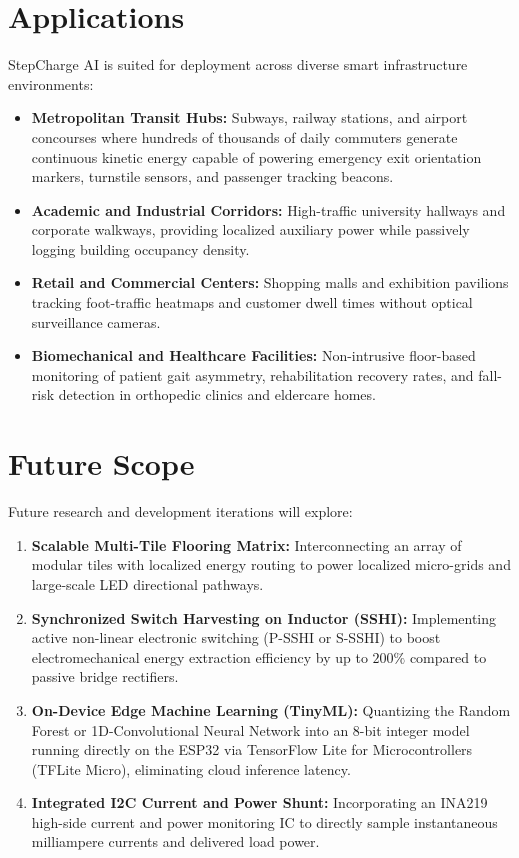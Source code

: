 \section{Applications}
StepCharge AI is suited for deployment across diverse smart infrastructure environments:
\begin{itemize}[itemsep=2pt,parsep=1pt,topsep=3pt]
    \item \textbf{Metropolitan Transit Hubs:} Subways, railway stations, and airport concourses where hundreds of thousands of daily commuters generate continuous kinetic energy capable of powering emergency exit orientation markers, turnstile sensors, and passenger tracking beacons.
    \item \textbf{Academic and Industrial Corridors:} High-traffic university hallways and corporate walkways, providing localized auxiliary power while passively logging building occupancy density.
    \item \textbf{Retail and Commercial Centers:} Shopping malls and exhibition pavilions tracking foot-traffic heatmaps and customer dwell times without optical surveillance cameras.
    \item \textbf{Biomechanical and Healthcare Facilities:} Non-intrusive floor-based monitoring of patient gait asymmetry, rehabilitation recovery rates, and fall-risk detection in orthopedic clinics and eldercare homes.
\end{itemize}

\section{Future Scope}
Future research and development iterations will explore:
\begin{enumerate}[itemsep=2pt,parsep=1pt,topsep=3pt]
    \item \textbf{Scalable Multi-Tile Flooring Matrix:} Interconnecting an array of modular tiles with localized energy routing to power localized micro-grids and large-scale LED directional pathways.
    \item \textbf{Synchronized Switch Harvesting on Inductor (SSHI):} Implementing active non-linear electronic switching (P-SSHI or S-SSHI) to boost electromechanical energy extraction efficiency by up to $200\%$ compared to passive bridge rectifiers.
    \item \textbf{On-Device Edge Machine Learning (TinyML):} Quantizing the Random Forest or 1D-Convolutional Neural Network into an 8-bit integer model running directly on the ESP32 via TensorFlow Lite for Microcontrollers (TFLite Micro), eliminating cloud inference latency.
    \item \textbf{Integrated I2C Current and Power Shunt:} Incorporating an INA219 high-side current and power monitoring IC to directly sample instantaneous milliampere currents and delivered load power.
\end{enumerate}

